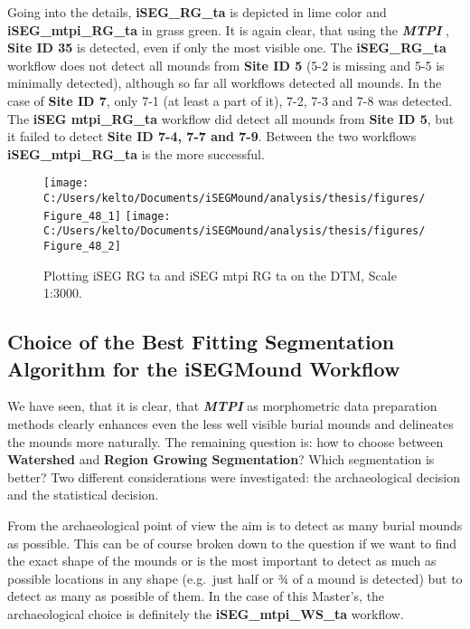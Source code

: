 \documentclass[
  12pt,
]{article}
\begin{document}
Going into the details, \textbf{iSEG\_RG\_ta} is depicted in lime color and \textbf{iSEG\_mtpi\_RG\_ta} in grass green. It is again clear, that using the \textbf{\emph{MTPI}} , \textbf{Site ID 35} is detected, even if only the most visible one.
The \textbf{iSEG\_RG\_ta} workflow does not detect all mounds from \textbf{Site ID 5} (5-2 is missing and 5-5 is minimally detected), although so far all workflows detected all mounds. In the case of \textbf{Site ID 7}, only 7-1 (at least a part of it), 7-2, 7-3 and 7-8 was detected.
The \textbf{iSEG mtpi\_RG\_ta} workflow did detect all mounds from \textbf{Site ID 5}, but it failed to detect \textbf{Site ID 7-4, 7-7 and 7-9}.
Between the two workflows \textbf{iSEG\_mtpi\_RG\_ta} is the more successful.

\begin{figure}
\texttt{[image: C:/Users/kelto/Documents/iSEGMound/analysis/thesis/figures/Figure\_48\_1]} \texttt{[image: C:/Users/kelto/Documents/iSEGMound/analysis/thesis/figures/Figure\_48\_2]} \caption{Plotting iSEG RG ta and iSEG mtpi RG ta on the DTM, Scale 1:3000.}\label{fig:Figure48}
\end{figure}

\newpage

\hypertarget{choice-of-the-best-fitting-segmentation-algorithm-for-the-isegmound-workflow}{%
\subsection{\texorpdfstring{\textbf{Choice of the Best Fitting Segmentation Algorithm for the iSEGMound Workflow}}{Choice of the Best Fitting Segmentation Algorithm for the iSEGMound Workflow}}\label{choice-of-the-best-fitting-segmentation-algorithm-for-the-isegmound-workflow}}

We have seen, that it is clear, that \textbf{\emph{MTPI}} as morphometric data preparation methods clearly enhances even the less well visible burial mounds and delineates the mounds more naturally. The remaining question is: how to choose between \textbf{Watershed} and \textbf{Region Growing Segmentation}? Which segmentation is better? Two different considerations were investigated: the archaeological decision and the statistical decision.

From the archaeological point of view the aim is to detect as many burial mounds as possible. This can be of course broken down to the question if we want to find the exact shape of the mounds or is the most important to detect as much as possible locations in any shape (e.g.~just half or ¾ of a mound is detected) but to detect as many as possible of them. In the case of this Master's, the archaeological choice is definitely the \textbf{iSEG\_mtpi\_WS\_ta} workflow.
\end{document}
